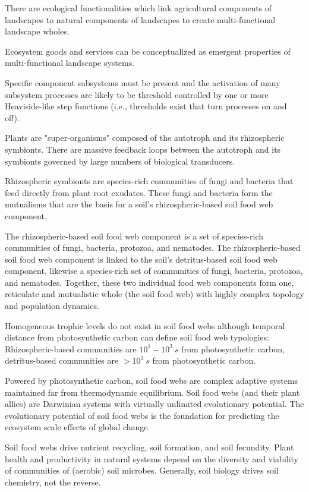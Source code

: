 \begin{outline}[enumerate]
  \1 There are ecological functionalities which link agricultural components of landscapes to natural components of landscapes to create multi-functional landscape wholes.
  
  \1 Ecosystem goods and services can be conceptualized as emergent properties of multi-functional landscape systems.
  
  \1 Specific component subsystems must be present and the activation of many subsystem processes are likely to be threshold controlled by one or more Heaviside-like step functions (i.e., thresholds exist that turn processes on and off).

  \1 Plants are "super-organisms" composed of the autotroph and its rhizospheric symbionts. There are massive feedback loops between the autotroph and its symbionts governed by large numbers of biological transducers.
  
  \1 Rhizospheric symbionts are species-rich communities of fungi and bacteria that feed directly from plant root exudates. These fungi and bacteria form the mutualisms that are the basis for a soil's rhizospheric-based soil food web component.

  \1 The rhizospheric-based soil food web component is a set of species-rich communities of fungi, bacteria, protozoa, and nematodes. The rhizospheric-based soil food web component is linked to the soil's detritus-based soil food web component, likewise a species-rich set of communities of fungi, bacteria, protozoa, and nematodes. Together, these two individual food web components form one, reticulate and mutualistic whole (the soil food web) with highly complex topology and population dynamics.
  
  \1 Homogeneous trophic levels do not exist in soil food webs although temporal distance from photosynthetic carbon can define soil food web typologies: Rhizospheric-based communities are $10^{1} - 10^{3} \ s$ from photosynthetic carbon, detritus-based communities are $ > 10^{3} \ s$ from photosynthetic carbon.  
  
  \1 Powered by photosynthetic carbon, soil food webs are complex adaptive systems maintained far from thermodynamic equilibrium. Soil food webs (and their plant allies) are Darwinian systems with virtually unlimited evolutionary potential. The evolutionary potential of soil food webs is the foundation for predicting the ecosystem scale effects of global change.
  
 \1 Soil food webs drive nutrient recycling, soil formation, and soil fecundity. Plant health and productivity in natural systems depend on the diversity and viability of communities of (aerobic) soil microbes. Generally, soil biology drives soil chemistry, not the reverse.
 

\end{outline}
